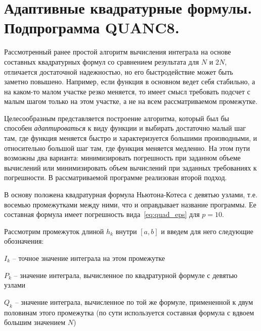 \section{Адаптивные квадратурные формулы. Подпрограмма \textbf{QUANC8}.}\label{sec:ch11}
Рассмотренный ранее простой алгоритм вычисления интеграла на основе составных квадратурных формул со сравнением
результата для $N$ и $2N$, отличается достаточной надежностью, но его быстродействие может быть заметно повышено.
Например, если функция в основном ведет себя стабильно, а на каком-то малом участке резко меняется, то имеет смысл
требовать подсчет с малым шагом только на этом участке, а не на всем рассматриваемом промежутке.

Целесообразным представляется построение алгоритма, который был бы способен \emph{адаптироваться} к виду функции и
выбирать достаточно малый шаг там, где функция меняется быстро и характеризуется большими производными, и относительно
большой шаг там, где функция меняется медленно. На этом пути возможны два варианта: минимизировать погрешность при
заданном объеме вычислений или минимизировать объем вычислений при заданных требованиях к погрешности. В рассматриваемой
программе реализован второй подход.

В основу положена квадратурная формула Ньютона-Котеса с девятью узлами, т.е. восемью промежутками между ними, что и
оправдывает название программы. Ее составная формула имеет погрешность вида~\eqref{eq:quad_eps} для $p=10$.

Рассмотрим промежуток длиной $h_k$ внутри $[a, b]$ и введем для него следующие обозначения:

$I_k$ -- точное значение интеграла на этом промежутке

$P_k$ -- значение интеграла, вычисленное по квадратурной формуле с девятью узлами

$Q_k$ -- значение интеграла, вычисленное по той же формуле, примененной к двум половинам этого промежутка (по сути
используется составная формула с вдвоем большим значением $N$)

